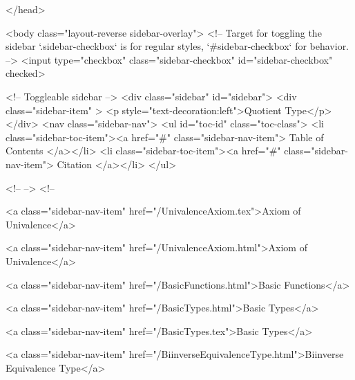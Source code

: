   
</head>




  <body class="layout-reverse sidebar-overlay">
    <!-- Target for toggling the sidebar `.sidebar-checkbox` is for regular
     styles, `#sidebar-checkbox` for behavior. -->
<input type="checkbox" class="sidebar-checkbox" id="sidebar-checkbox" checked>

<!-- Toggleable sidebar -->
<div class="sidebar" id="sidebar">
  <div class="sidebar-item" >
    <p style="text-decoration:left">Quotient Type</p>
  </div>
  <nav class="sidebar-nav">
    <ul id="toc-id" class="toc-class">
  <li class="sidebar-toc-item"><a href="#" class="sidebar-nav-item"> Table of Contents </a></li>
  <li class="sidebar-toc-item"><a href="#" class="sidebar-nav-item"> Citation </a></li>
</ul>


    <!--  -->
    <!-- 
      
    
      
    
      
    
      
    
      
        
      
    
      
        
          <a class="sidebar-nav-item" href="/UnivalenceAxiom.tex">Axiom of Univalence</a>
        
      
    
      
        
          <a class="sidebar-nav-item" href="/UnivalenceAxiom.html">Axiom of Univalence</a>
        
      
    
      
        
          <a class="sidebar-nav-item" href="/BasicFunctions.html">Basic Functions</a>
        
      
    
      
        
          <a class="sidebar-nav-item" href="/BasicTypes.html">Basic Types</a>
        
      
    
      
        
          <a class="sidebar-nav-item" href="/BasicTypes.tex">Basic Types</a>
        
      
    
      
        
          <a class="sidebar-nav-item" href="/BiinverseEquivalenceType.html">Biinverse Equivalence Type</a>
        
